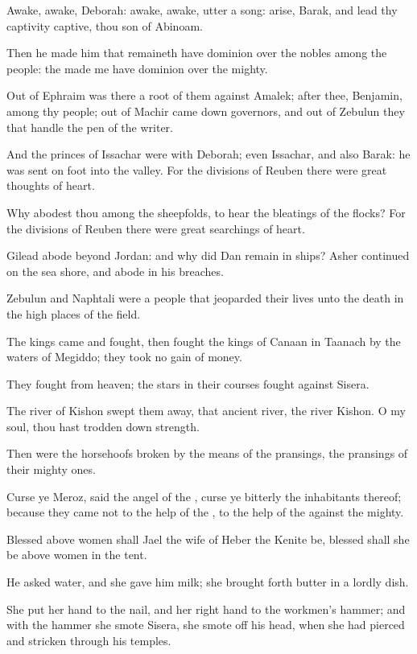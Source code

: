 \Verse Awake, awake, Deborah: awake, awake, utter a song: arise, Barak, and lead thy captivity captive, thou son of Abinoam.

\Verse Then he made him that remaineth have dominion over the nobles among the people: the \LORD made me have dominion over the mighty.

\Verse Out of Ephraim was there a root of them against Amalek; after thee, Benjamin, among thy people; out of Machir came down governors, and out of Zebulun they that handle the pen of the writer.

\Verse And the princes of Issachar were with Deborah; even Issachar, and also Barak: he was sent on foot into the valley. For the divisions of Reuben there were great thoughts of heart.

\Verse Why abodest thou among the sheepfolds, to hear the bleatings of the flocks? For the divisions of Reuben there were great searchings of heart.

\Verse Gilead abode beyond Jordan: and why did Dan remain in ships?  Asher continued on the sea shore, and abode in his breaches.

\Verse Zebulun and Naphtali were a people that jeoparded their lives unto the death in the high places of the field.

\Verse The kings came and fought, then fought the kings of Canaan in Taanach by the waters of Megiddo; they took no gain of money.

\Verse They fought from heaven; the stars in their courses fought against Sisera.

\Verse The river of Kishon swept them away, that ancient river, the river Kishon. O my soul, thou hast trodden down strength.

\Verse Then were the horsehoofs broken by the means of the pransings, the pransings of their mighty ones.

\Verse Curse ye Meroz, said the angel of the \LORD, curse ye bitterly the inhabitants thereof; because they came not to the help of the \LORD, to the help of the \LORD against the mighty.

\Verse Blessed above women shall Jael the wife of Heber the Kenite be, blessed shall she be above women in the tent.

\Verse He asked water, and she gave him milk; she brought forth butter in a lordly dish.

\Verse She put her hand to the nail, and her right hand to the workmen's hammer; and with the hammer she smote Sisera, she smote off his head, when she had pierced and stricken through his temples.

